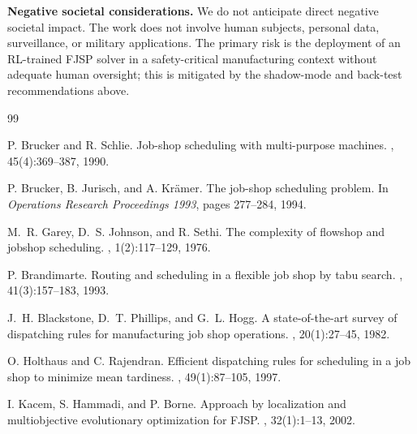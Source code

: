 \documentclass[10pt]{article}
\theoremstyle{definition}
\begin{document}
\textbf{Negative societal considerations.}
We do not anticipate direct negative societal impact.
The work does not involve human subjects, personal
data, surveillance, or military applications. The
primary risk is the deployment of an RL-trained FJSP
solver in a safety-critical manufacturing context
without adequate human oversight; this is mitigated by
the shadow-mode and back-test recommendations above.



\begin{thebibliography}{99}
\small

P. Brucker and R. Schlie.
\newblock Job-shop scheduling with multi-purpose machines.
, 45(4):369--387, 1990.

P. Brucker, B. Jurisch, and A. Kr\"amer.
\newblock The job-shop scheduling problem.
\newblock In {\em Operations Research Proceedings 1993},
pages 277--284, 1994.

M.~R. Garey, D.~S. Johnson, and R. Sethi.
\newblock The complexity of flowshop and jobshop scheduling.
,
1(2):117--129, 1976.

P. Brandimarte.
\newblock Routing and scheduling in a flexible job shop
by tabu search.
,
41(3):157--183, 1993.

J.~H. Blackstone, D.~T. Phillips, and G.~L. Hogg.
\newblock A state-of-the-art survey of dispatching rules
for manufacturing job shop operations.
,
20(1):27--45, 1982.

O. Holthaus and C. Rajendran.
\newblock Efficient dispatching rules for scheduling in a
job shop to minimize mean tardiness.
,
49(1):87--105, 1997.

I. Kacem, S. Hammadi, and P. Borne.
\newblock Approach by localization and multiobjective
evolutionary optimization for FJSP.
, 32(1):1--13, 2002.


\end{thebibliography}
\end{document}
